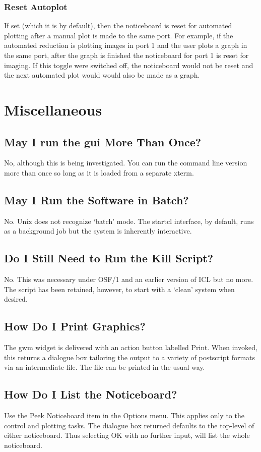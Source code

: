 \documentclass[a4paper]{book}
\newcommand{\stardocinitials}  {SUN}
\newcommand{\stardocnumber}    {27.5}
\newcommand{\stardocname}{\stardocinitials /\stardocnumber}
\renewcommand{\_}{{\tt\char'137}}
\begin{document}
\subsection{Reset Autoplot}
If set (which it is by default), then the noticeboard is reset for automated plotting
after a manual plot is made to the same port. For example, if the automated reduction
is plotting images in port 1 and the user plots a graph in the same port, after the
graph is finished the noticeboard for port 1 is reset for imaging. If this toggle were
switched off, the noticeboard would not be reset and the next automated plot would would
also be made as a graph.

\chapter{Miscellaneous}
\markboth{Miscellaneous}{\stardocname}
\section{May I run the {\sc gui} More Than Once?}
No, although this is being investigated. You can run the command line version more than
once so long as it is loaded from a separate xterm.

\section{May I Run the Software in Batch?}
No. Unix does not recognize `batch' mode. The {\sc startcl} interface, by default,
runs as a background job but the system is inherently interactive.

\section{Do I Still Need to Run the Kill Script?}
No. This was necessary under OSF/1 and an earlier version of ICL but no more. The
script has been retained, however, to start with a `clean' system when desired.

\section{How Do I Print Graphics?}
The {\sc gwm} widget is delivered with an action button labelled {\sf Print}. When
invoked, this returns a dialogue box tailoring the output to a variety of postscript
formats via an intermediate file. The file can be printed in the usual way.

\section{How Do I List the Noticeboard?}
Use the {\sf Peek Noticeboard} item in the {\sf Options} menu. This applies only to
the control and plotting tasks. The dialogue box returned defaults to the top-level
of either noticeboard. Thus selecting {\sf OK} with no further input, will list the
whole noticeboard.
\end{document}
